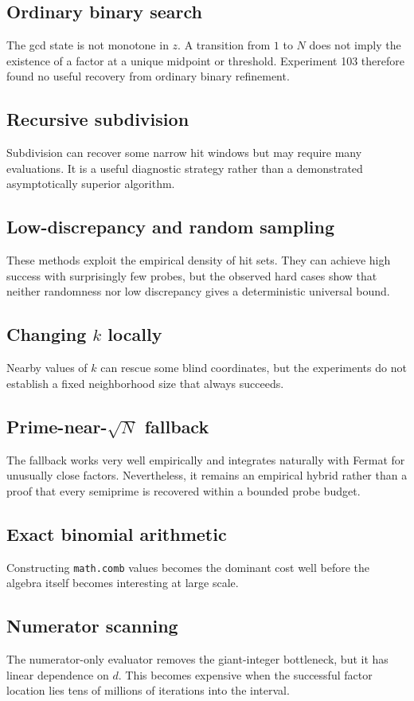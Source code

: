 \documentclass[11pt,a4paper]{article}
\begin{document}
\subsection{Ordinary binary search}
The gcd state is not monotone in $z$. A transition from $1$ to $N$ does not imply the existence of a factor at a unique midpoint or threshold. Experiment 103 therefore found no useful recovery from ordinary binary refinement.

\subsection{Recursive subdivision}
Subdivision can recover some narrow hit windows but may require many evaluations. It is a useful diagnostic strategy rather than a demonstrated asymptotically superior algorithm.

\subsection{Low-discrepancy and random sampling}
These methods exploit the empirical density of hit sets. They can achieve high success with surprisingly few probes, but the observed hard cases show that neither randomness nor low discrepancy gives a deterministic universal bound.

\subsection{Changing $k$ locally}
Nearby values of $k$ can rescue some blind coordinates, but the experiments do not establish a fixed neighborhood size that always succeeds.

\subsection{Prime-near-$\sqrt N$ fallback}
The fallback works very well empirically and integrates naturally with Fermat for unusually close factors. Nevertheless, it remains an empirical hybrid rather than a proof that every semiprime is recovered within a bounded probe budget.

\subsection{Exact binomial arithmetic}
Constructing \texttt{math.comb} values becomes the dominant cost well before the algebra itself becomes interesting at large scale.

\subsection{Numerator scanning}
The numerator-only evaluator removes the giant-integer bottleneck, but it has linear dependence on $d$. This becomes expensive when the successful factor location lies tens of millions of iterations into the interval.
\end{document}
